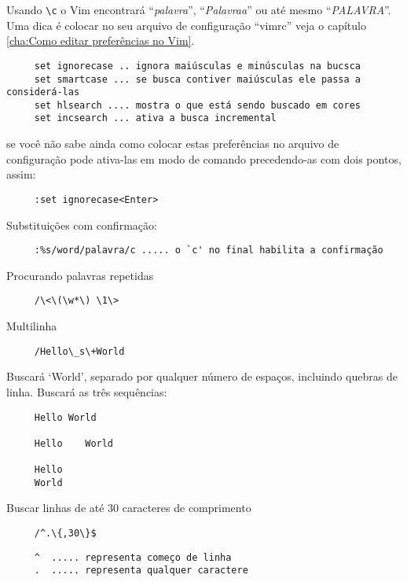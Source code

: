 Usando \verb|\c| o Vim encontrará ``{\em{palavra}}'', ``{\em{Palavraa}}'' ou
até mesmo ``{\em{PALAVRA}}''. Uma dica é colocar no seu arquivo de
configuração ``vimrc'' veja o capítulo \ref{cha:Como editar preferências no Vim}.

\begin{verbatim}
     set ignorecase .. ignora maiúsculas e minúsculas na bucsca
     set smartcase ... se busca contiver maiúsculas ele passa a considerá-las
     set hlsearch .... mostra o que está sendo buscado em cores
     set incsearch ... ativa a busca incremental
\end{verbatim}

se você não sabe ainda como colocar estas preferências no arquivo de configuração pode
ativa-las em modo de comando precedendo-as com dois pontos, assim:

\begin{verbatim}
     :set ignorecase<Enter>
\end{verbatim}

Substituições com confirmação:

\begin{verbatim}
     :%s/word/palavra/c ..... o `c' no final habilita a confirmação
\end{verbatim}


Procurando palavras repetidas

\begin{verbatim}
     /\<\(\w*\) \1\>
\end{verbatim}

Multilinha

\begin{verbatim}
     /Hello\_s\+World
\end{verbatim}

Buscará `World', separado por qualquer número de espaços,
incluindo quebras de linha. Buscará as três sequências:

\begin{verbatim}
     Hello World

     Hello    World

     Hello
     World
\end{verbatim}

Buscar linhas de até 30 caracteres de comprimento

\begin{verbatim}
     /^.\{,30\}$
\end{verbatim}

\begin{verbatim}
     ^  ..... representa começo de linha
     .  ..... representa qualquer caractere
\end{verbatim}


